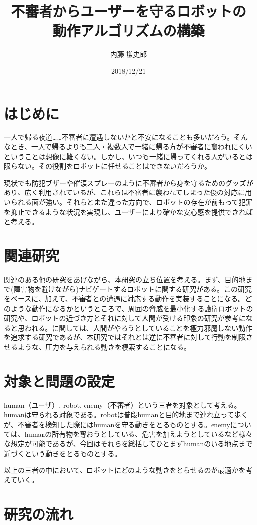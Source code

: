 \documentclass[twocolumn]{jsarticle}
\title{不審者からユーザーを守るロボットの\\動作アルゴリズムの構築}
\author{内藤 謙史郎}
\date{2018/12/21}
\begin{document}
\maketitle
\section{はじめに}
一人で帰る夜道……不審者に遭遇しないかと不安になることも多いだろう。そんなとき、一人で帰るよりも二人・複数人で一緒に帰る方が不審者に襲われにくいということは想像に難くない。しかし、いつも一緒に帰ってくれる人がいるとは限らない。その役割をロボットに任せることはできないだろうか。

現状でも防犯ブザーや催涙スプレーのように不審者から身を守るためのグッズがあり、広く利用されているが、これらは不審者に襲われてしまった後の対応に用いられる面が強い。それらとまた違った方向で、ロボットの存在が前もって犯罪を抑止できるような状況を実現し、ユーザーにより確かな安心感を提供できればと考える。

\section{関連研究}
関連のある他の研究をあげながら、本研究の立ち位置を考える。まず、目的地まで(障害物を避けながら)ナビゲートするロボットに関する研究がある\cite{1}。この研究をベースに、加えて、不審者との遭遇に対応する動作を実装することになる。どのような動作になるかというところで、周囲の脅威を最小化する護衛ロボットの研究\cite{2}や、ロボットの近づき方とそれに対して人間が受ける印象の研究\cite{3}が参考になると思われる。\cite{3}に関しては、人間がやろうとしていることを極力邪魔しない動作を追求する研究であるが、本研究ではそれとは逆に不審者に対して行動を制限させるような、圧力を与えられる動きを模索することになる。

\section{対象と問題の設定}
human（ユーザ）, robot, enemy（不審者）という三者を対象として考える。humanは守られる対象である。robotは普段humanと目的地まで連れ立って歩くが、不審者を検知した際にはhumanを守る動きをとるものとする。enemyについては、humanの所有物を奪おうとしている、危害を加えようとしているなど様々な想定が可能であるが、今回はそれらを総括してひとまずhumanのいる地点まで近づくという動きをとるものとする。

以上の三者の中において、ロボットにどのような動きをとらせるのが最適かを考えていく。

\section{研究の流れ}
\end{document}
